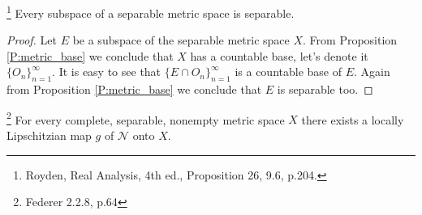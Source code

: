 \begin{proposition} \label{P:metric_sep}
\footnote{Royden, Real Analysis, 4th ed., Proposition 26, 9.6, p.204.} 
Every subspace of a separable metric space is separable.
\end{proposition}
\begin{proof}
Let $E$ be a subspace of the separable metric space $X$. From Proposition
\ref{P:metric_base} we conclude that $X$ has a countable base, let's denote it 
$\{O_n\}_{n=1}^{\infty}$. It is easy to see that 
$\{E\cap O_n\}_{n=1}^{\infty}$ is a countable base of $E$. Again from
Proposition \ref{P:metric_base} we conclude that $E$ is separable too.
\end{proof}

\begin{theorem} \label{T:lipschitz_compltSep}
\footnote{Federer 2.2.8, p.64}
For every complete, separable, nonempty metric space $X$ there exists a locally
Lipschitzian map $g$ of $\mathcal{N}$ onto $X$.
\end{theorem}
